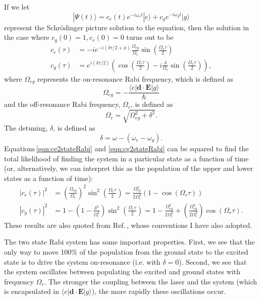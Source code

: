 If we let 
\begin{equation}
|\Psi(t)\rangle = c_e(t)e^{-i\omega_e t}|e\rangle + c_g e^{-i\omega_g t}|g\rangle
\end{equation}
represent the Schr\"odinger picture solution to the equation, then the solution in the case where $c_g(0)=1,c_e(0)=0$ turns out to be 
\begin{align}
c_e(\tau)&=-i e^{-i(\delta \tau/2+\phi)} \frac{\Omega_{eg}}{\Omega_{r}} \sin\left(\frac{\Omega_r \tau}{2}\right)\label{eqn:ce2stateRabi}\\
c_g(\tau)&=e^{i(\delta \tau/2)} \left(
\cos\left(\frac{\Omega_r \tau}{2}\right)
- i\frac{\delta}{\Omega_r} \sin\left(\frac{\Omega_r \tau}{2}\right)\right)
\label{eqn:cg2stateRabi},
\end{align}
where $\Omega_{eg}$ represents the on-resonance Rabi frequency, which is defined as 
\begin{equation}
\Omega_{eg}=-\frac{\langle e |\mathbf{d}\cdot\mathbf{E}|g \rangle }{\hbar}
\end{equation}
and the off-resonance Rabi frequency, $\Omega_r$, is defined as 
\begin{equation}
\Omega_r=\sqrt{\Omega_{eg}^2+\delta^2}.
\end{equation}
The detuning, $\delta$, is defined as 
\begin{equation}
\delta=\omega-(\omega_e-\omega_g).
\end{equation}
Equations\,\ref{eqn:ce2stateRabi} and \ref{eqn:cg2stateRabi} can be squared to find the total likelihood of finding the system in a particular state as a function of time (or, alternatively, we can interpret this as the population of the upper and lower states as a function of time):
\begin{align}
|c_e(\tau)|^2&=\left(\frac{\Omega_{eg}}{\Omega_r}\right)^2 \sin^2\left(\frac{\Omega_r\tau}{2}\right)
=\frac{\Omega_{eg}^2}{2\Omega_r^2}(1-\cos(\Omega_r\tau))\\
|c_g(\tau)|^2&=1-\left(1-\frac{\delta^2}{\Omega_r^2}\right)\sin^2
\left(\frac{\Omega_r \tau}{2}\right)
=1-\frac{\Omega_{eg}^2}{2\Omega_r^2} + \left(\frac{\Omega_{eg}^2}{2\Omega_r^2}\right)\cos(\Omega_r \tau).
\end{align}
These results are also quoted from Ref.\,\cite{Young1997363}, whose conventions I have also adopted.

The two state Rabi system has some important properties. First, we see that the only way to move 100\% of the population from the ground state to the excited state is to drive the system on-resonance (i.e. with $\delta=0$). Second, we see that the system oscillates between populating the excited and ground states with frequency $\Omega_{r}$. The stronger the coupling between the laser and the system (which is encapsulated in $\langle e|\mathbf{d}\cdot\mathbf{E}|g\rangle$), the more rapidly these oscillations occur. 
